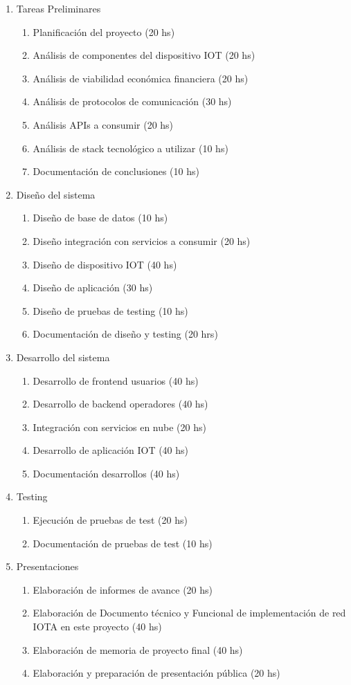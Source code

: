\documentclass[11pt]{charter}
\begin{document}
\begin{enumerate}
\item Tareas Preliminares
	\begin{enumerate}
	\item Planificación del proyecto (20 hs)
	\item Análisis de componentes del dispositivo IOT (20 hs)
	\item Análisis de viabilidad económica financiera (20 hs)
	\item Análisis de protocolos de comunicación (30 hs)
	\item Análisis APIs a consumir (20 hs)
	\item Análisis de stack tecnológico a utilizar (10 hs) 
	\item Documentación de conclusiones (10 hs) 
	\end{enumerate}	
\item Diseño del sistema
	\begin{enumerate}
	\item Diseño de base de datos (10 hs)
	\item Diseño integración con servicios a consumir (20 hs)
	\item Diseño de dispositivo IOT (40 hs) 
	\item Diseño de aplicación (30 hs)
	\item Diseño de pruebas de testing (10 hs) 
	\item Documentación de diseño y testing (20 hrs) 	
	\end{enumerate}
\item Desarrollo del sistema 
	\begin{enumerate}
	\item Desarrollo de frontend usuarios  (40 hs)
	\item Desarrollo de backend operadores (40  hs)
	\item Integración con servicios en nube (20 hs)
	\item Desarrollo de aplicación IOT  (40 hs)
	\item Documentación desarrollos (40 hs)
	\end{enumerate}
\item Testing
	\begin{enumerate}
	\item Ejecución de pruebas de test (20 hs)
	\item Documentación de pruebas de test (10 hs)
	\end{enumerate}
\item Presentaciones
	\begin{enumerate}
	\item Elaboración de informes de avance (20 hs)
	\item Elaboración de Documento técnico y Funcional de implementación de red IOTA en este proyecto (40 hs)
	\item Elaboración de memoria de proyecto final (40 hs) 
	\item Elaboración y preparación de presentación pública  (20 hs)
	
	\end{enumerate}
\end{enumerate}
\end{document}
